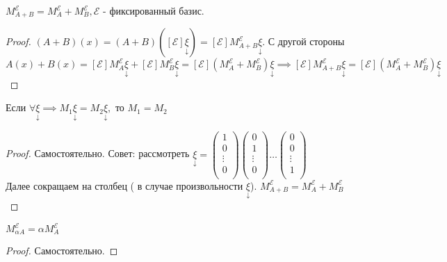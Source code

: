 \documentclass[../main.tex]{subfiles}
\begin{document}
\begin{theorem}
    $M_{A+B}^{\mathcal{E}}= M_{A}^{\mathcal{E}}+M_{B}^{\mathcal{E}}, \mathcal{E}$ - фиксированный базис.
\end{theorem}
\begin{proof}
    $(A+B)(x)=(A+B)([\mathcal{E}]\underset{\downarrow}{\xi})= [\mathcal{E}]M_{A+B}^{\mathcal{E}}\underset{\downarrow}{\xi}$. С другой стороны $A(x)+B(x)= [\mathcal{E}]M_{A}^{\mathcal{E}}\underset{\downarrow}{\xi}+ [\mathcal{E}]M_{B}^{\mathcal{E}}\underset{\downarrow}{\xi}= [\mathcal{E}](M_{A}^{\mathcal{E}}+M_{B}^{\mathcal{E}})\underset{\downarrow}{\xi}\implies [\mathcal{E}]M_{A+B}^{\mathcal{E}}\underset{\downarrow}{\xi}= [\mathcal{E}](M_{A}^{\mathcal{E}}+M_{B}^{\mathcal{E}})\underset{\downarrow}{\xi}$
\end{proof}
\begin{lemma}
    Если $\forall \underset{\downarrow}{\xi}\implies M_{1}\underset{\downarrow}{\xi}=M_{2} \underset{\downarrow}{\xi},$ то $M_{1}=M_{2}$
\end{lemma}
\begin{proof}
    Самостоятельно. Совет: рассмотреть $\underset{\downarrow}{\xi}= 
    \begin{pmatrix}
        1 \\
        0 \\
        \vdots \\
        0 \\
    \end{pmatrix} \begin{pmatrix}
        0 \\
        1 \\
        \vdots \\
        0 \\
    \end{pmatrix} \dots \begin{pmatrix}
        0 \\
        0 \\
        \vdots \\
        1 \\
    \end{pmatrix}$
    \\Далее сокращаем на столбец ( в случае произвольности $\underset{\downarrow}{\xi}$). $M_{A+B}^{\mathcal{E}}=M_{A}^{\mathcal{E}}+M_{B}^{\mathcal{E}}$
\end{proof}
\begin{theorem}
    $M_{\alpha A}^{\mathcal{E}}= \alpha M_{A}^{\mathcal{E}}$
\end{theorem}
\begin{proof}
    Самостоятельно. 
\end{proof}
\end{document}
